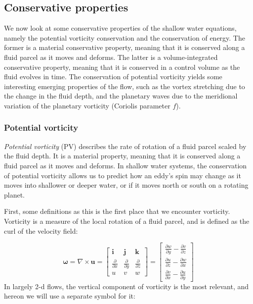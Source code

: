 \documentclass[12pt]{article}
\numberwithin{equation}{section}
\numberwithin{figure}{section}
\numberwithin{table}{section}
\begin{document}
\subsection{Conservative properties}

We now look at some conservative properties of the shallow water equations,
namely the potential vorticity conservation and the conservation of energy.
The former is a material conservative property, meaning that it is conserved
along a fluid parcel as it moves and deforms.
The latter is a volume-integrated conservative property, meaning that it is
conserved in a control volume as the fluid evolves in time.
The conservation of potential vorticity yields some interesting emerging
properties of the flow, such as the vortex stretching due to the change in the
fluid depth, and the planetary waves due to the meridional variation of the
planetary vorticity (Coriolis parameter $f$).

\subsubsection{Potential vorticity}

\textit{Potential vorticity} (PV) describes the rate
of rotation of a fluid parcel scaled by the fluid depth.
It is a material property, meaning that it is conserved along a fluid parcel
as it moves and deforms.
In shallow water systems, the conservation of potential vorticity allows us to
predict how an eddy's spin may change as it moves into shallower or deeper water,
or if it moves north or south on a rotating planet.

First, some definitions as this is the first place that we encounter vorticity.
Vorticity is a measure of the local rotation of a fluid parcel,
and is defined as the curl of the velocity field:

\begin{equation}
  \boldsymbol{\omega} =
  \nabla \times \mathbf{u} =
  \begin{bmatrix}
    \mathbf{i} & \mathbf{j} & \mathbf{k} \\
    \frac{\partial}{\partial x} & \frac{\partial}{\partial y} & \frac{\partial}{\partial z} \\
    u & v & w
  \end{bmatrix} =
  \begin{bmatrix}
    \frac{\partial w}{\partial y} - \frac{\partial v}{\partial z} \\
    \frac{\partial u}{\partial z} - \frac{\partial w}{\partial x} \\
    \frac{\partial v}{\partial x} - \frac{\partial u}{\partial y}
  \end{bmatrix}
\end{equation}
In largely 2-d flows, the vertical component of vorticity is the most relevant,
and hereon we will use a separate symbol for it:
\end{document}
